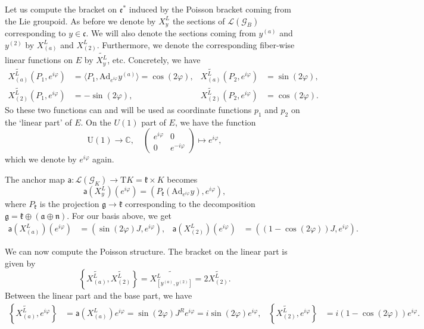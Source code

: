 \documentclass[a4paper,11pt]{amsart}
\newcommand{\C}{\mathbb C}
\newcommand{\s}[1]{\mathcal{#1}}
\newcommand{\fr}[1]{\mathfrak{#1}}
\newcommand{\sm}[1]{\mathsf{#1}}
\newcommand{\rT}{\mathrm T}
\newcommand{\vph}{\varphi}
\newcommand{\Ad}{\mathrm{Ad}}
\theoremstyle{definition}
\theoremstyle{remark}
\begin{document}
Let us compute the bracket on $\fr{e}^*$ induced by the Poisson bracket coming from the Lie groupoid.
As before we denote by $X^L_y$ the sections of $\s{L}(\s{G}_B)$ corresponding to $y \in \fr{c}$.
We will also denote the sections coming from $y^{(a)}$ and $y^{(2)}$ by $X^L_{(a)}$ and $X^L_{(2)}$.
Furthermore, we denote the corresponding fiber-wise linear functions on $E$ by $\widetilde{X^L_{y}}$, etc.
Concretely, we have
\begin{align*}
\widetilde{X^L_{(a)}} (P_1,e^{i\vph}) &= \langle P_1, \Ad_{e^{i\vph}} y^{(a)} \rangle = \cos(2\vph), &
\widetilde{X^L_{(a)}} (P_2,e^{i\vph}) &= \sin(2\vph),\\
\widetilde{X^L_{(2)}} (P_1,e^{i\vph}) &= -\sin(2\vph), &
\widetilde{X^L_{(2)}} (P_2,e^{i\vph}) &= \cos(2\vph) .
\end{align*}
So these two functions can and will be used as coordinate functions $p_1$ and $p_2$ on the `linear part' of $E$.
On the $U(1)$ part of $E$, we have the function
\[
\mathrm{U}(1) \to \C, \quad  \begin{pmatrix}
 e^{i\vph} & 0 \\ 0 & e^{-i\vph} 
\end{pmatrix}
 \mapsto e^{i\vph},
\]
which we denote by $e^{i \vph}$ again.

The anchor map $\sm{a} \colon \s{L}( \s{G}_K ) \rightarrow \rT K = \fr{k} \times K$ becomes
\[
\sm{a}( X^L_y ) (e^{i\vph}) = (P_{\fr{k}} \mathopen{} \left( \mathrm{Ad}_{e^{i\vph}} y \right), e^{i\vph}),
\]
where $P_{\fr{k}}$ is the projection $\fr{g} \to \fr{k}$ corresponding to the decomposition $\fr{g} = \fr{k} \oplus (\fr{a} \oplus \fr{n})$.
For our basis above, we get
\begin{align*}
\sm{a}( X^L_{(a)} ) (e^{i\vph}) &= (\sin(2\vph) J, e^{i \vph}),&
\sm{a}( X^L_{(2)} ) (e^{i\vph}) &= (( 1 - \cos(2\vph)) J, e^{i \vph}).
\end{align*}

We can now compute the Poisson structure.
The bracket on the linear part is given by
\[
\left\{\widetilde{X^L_{(a)}} , \widetilde{X^L_{(2)}} \right\} = \widetilde{X^L_{[y^{(a)}, y^{(2)}]}} = 2 \widetilde{X^L_{(2)}}.
\]
Between the linear part and the base part, we have
\begin{align*}
\left\{ \widetilde{X^L_{(a)}} , e^{i\vph} \right\} &= \sm{a} (X^L_{(a)}) e^{i\vph} = \sin(2\vph) J^R e^{i\vph} = i \sin(2\vph) e^{i\vph},&
\left\{ \widetilde{X^L_{(2)}} , e^{i\vph} \right\} &= i \mathopen{} \left( 1 - \cos(2\vph) \right) e^{i\vph} .
\end{align*}
\end{document}
